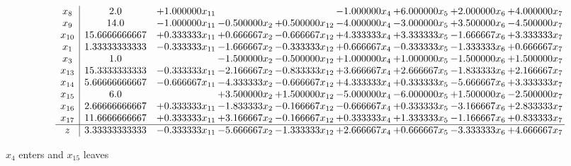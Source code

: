 \documentclass[10pt]{article}
\begin{document}
 \[\begin{array}{c| c c@{\hskip 2pt} c@{\hskip 2pt} c@{\hskip 2pt} c@{\hskip 2pt} c@{\hskip 2pt} c@{\hskip 2pt} c@{\hskip 2pt} }
 x_{8}   &  2.0 & + 1.000000 x_{11} &    &   & -1.000000 x_{4} & + 6.000000 x_{5} & + 2.000000 x_{6} & + 4.000000 x_{7}\\
 x_{9}   &  14.0 & -1.000000 x_{11} & -0.500000 x_{2} & + 0.500000 x_{12} & -4.000000 x_{4} & -3.000000 x_{5} & + 3.500000 x_{6} & -4.500000 x_{7}\\
 x_{10}   &  15.6666666667 & + 0.333333 x_{11} & + 0.666667 x_{2} & -0.666667 x_{12} & + 4.333333 x_{4} & + 3.333333 x_{5} & -1.666667 x_{6} & + 3.333333 x_{7}\\
 x_{1}   &  1.33333333333 & -0.333333 x_{11} & -1.666667 x_{2} & -0.333333 x_{12} & + 0.666667 x_{4} & -0.333333 x_{5} & -1.333333 x_{6} & + 0.666667 x_{7}\\
 x_{3}   &  1.0  &   & -1.500000 x_{2} & -0.500000 x_{12} & + 1.000000 x_{4} & + 1.000000 x_{5} & -1.500000 x_{6} & + 1.500000 x_{7}\\
 x_{13}   &  15.3333333333 & -0.333333 x_{11} & -2.166667 x_{2} & -0.833333 x_{12} & + 3.666667 x_{4} & + 2.666667 x_{5} & -1.833333 x_{6} & + 2.166667 x_{7}\\
 x_{14}   &  5.66666666667 & -0.666667 x_{11} & -4.333333 x_{2} & -0.666667 x_{12} & + 4.333333 x_{4} & + 0.333333 x_{5} & -5.666667 x_{6} & + 3.333333 x_{7}\\
 x_{15}   &  6.0  &   & + 3.500000 x_{2} & + 1.500000 x_{12} & -5.000000 x_{4} & -6.000000 x_{5} & + 1.500000 x_{6} & -2.500000 x_{7}\\
 x_{16}   &  2.66666666667 & + 0.333333 x_{11} & -1.833333 x_{2} & -0.166667 x_{12} & -0.666667 x_{4} & + 0.333333 x_{5} & -3.166667 x_{6} & + 2.833333 x_{7}\\
 x_{17}   &  11.6666666667 & + 0.333333 x_{11} & + 3.166667 x_{2} & -0.166667 x_{12} & + 0.333333 x_{4} & + 1.333333 x_{5} & -1.166667 x_{6} & + 0.833333 x_{7}\\
\hline
z    &  3.33333333333 & -0.333333 x_{11} & -5.666667 x_{2} & -1.333333 x_{12} & + 2.666667 x_{4} & + 0.666667 x_{5} & -3.333333 x_{6} & + 4.666667 x_{7}\\
\end{array}\]


 $ x_{4} $ enters and $ x_{15} $ leaves 
\end{document}

